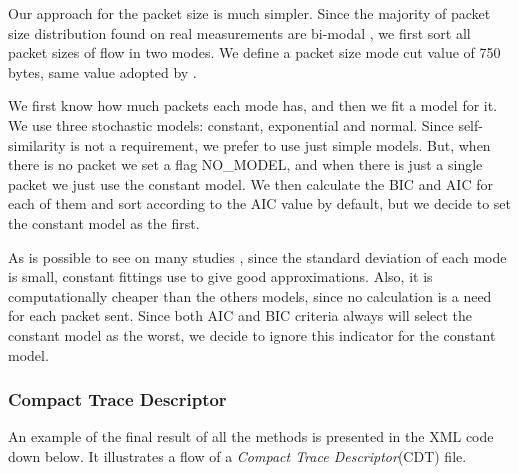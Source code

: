 Our approach for the packet size is much simpler. Since the majority of packet size distribution found on real measurements are bi-modal \cite{packet-distribution-model}\cite{sourcesonoff-paper}\cite{udp-flows-model}, we first sort all packet sizes of flow in two modes. We define a packet size mode cut value of 750 bytes, same value adopted by \cite{udp-flows-model}. 

We first know how much packets each mode has, and then we fit a model for it. We use three stochastic models: constant, exponential and normal. Since self-similarity is not a requirement, we prefer to use just simple models. But, when there is no packet we set a flag NO\_MODEL, and when there is just a single packet we just use the constant model.  We then calculate the BIC and AIC for each of them and sort according to the AIC value by default, but we decide to set the constant model as the first.

As is possible to see on many studies \cite{packet-distribution-model}\cite{udp-flows-model}, since the standard deviation of each mode is small, constant fittings use to give good approximations. Also, it is computationally cheaper than the others models, since no calculation is a need for each packet sent. Since both AIC and BIC criteria always will select the constant model as the worst, we decide to ignore this indicator for the constant model.

\subsubsection{Compact Trace Descriptor}

An example of the final result of all the methods is presented in the XML code down below. It illustrates a flow of a \textit{Compact Trace Descriptor}(CDT) file.

